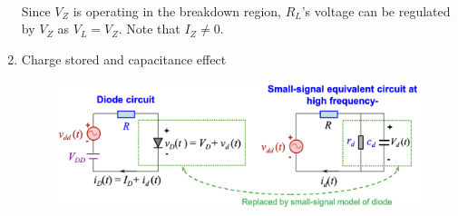\documentclass{article}
\begin{document}
\begin{enumerate}
\begin{figure}[h]
    \end{figure}\\
    Since $V_Z$ is operating in the breakdown region, $R_L$'s voltage can be regulated by $V_Z$ as $V_L=V_Z$. Note that $I_Z \neq 0$.
    \item Charge stored and capacitance effect
    \begin{figure}[h]
        \centering
        \includegraphics[width=1\linewidth]{image/diodesmall-signal.png}
    \end{figure}
\end{enumerate}
\end{document}
